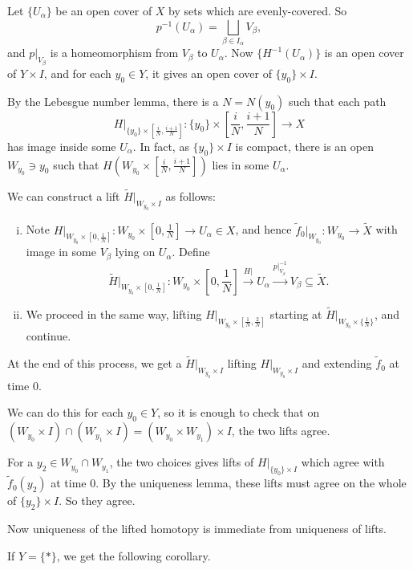 \documentclass[12pt]{article}
\begin{document}
\begin{proofbox}
	Let $\{U_\alpha\}$ be an open cover of $X$ by sets which are evenly-covered. So
	\[
	p^{-1}(U_\alpha) = \bigsqcup_{\beta \in I_\alpha} V_\beta,
	\]
	and $p|_{V_\beta}$ is a homeomorphism from $V_\beta$ to $U_\alpha$. Now $\{H^{-1}(U_\alpha)\}$ is an open cover of $Y \times I$, and for each $y_0 \in Y$, it gives an open cover of $\{y_0\} \times I$.

	By the Lebesgue number lemma, there is a $N = N(y_0)$ such that each path
	\[
		H|_{\{y_0\} \times [\frac{i}{N}, \frac{i+1}{N}]} : \{y_0\} \times \left[ \frac{i}{N}, \frac{i+1}{N}\right] \to X
	\]
	has image inside some $U_\alpha$. In fact, as $\{y_0\} \times I$ is compact, there is an open $W_{y_0} \ni y_0$ such that $H(W_{y_0} \times [\frac{i}{N}, \frac{i+1}{N}])$ lies in some $U_\alpha$.

	We can construct a lift $\tilde H|_{W_{y_0} \times I}$ as follows:
	\begin{enumerate}[(i)]
		\item Note $H|_{W_{y_0} \times [0, \frac{1}{N}]} : W_{y_0} \times [0, \frac{1}{N}] \to U_\alpha \in X$, and hence $\tilde f_0 |_{W_{y_0}} : W_{y_0} \to \tilde X$ with image in some $V_\beta$ lying on $U_\alpha$. Define
			\[
				\tilde H|_{W_{y_0} \times [0, \frac{1}{N}]} : W_{y_0} \times \left[0, \frac{1}{N} \right] \overset{H|}{\to} U_\alpha \overset{p|_{V_\beta}^{-1}}{\to} V_\beta \subseteq \tilde X.
			\]
		\item We proceed in the same way, lifting $H|_{W_{y_0} \times [\frac{1}{N}, \frac{2}{N}]}$ starting at $\tilde H|_{W_{y_0} \times \{\frac{1}{N}\}}$, and continue.
	\end{enumerate}
	At the end of this process, we get a $\tilde H|_{W_{y_0} \times I}$ lifting $H|_{W_{y_0} \times I}$ and extending $\tilde f_0$ at time $0$.

	We can do this for each $y_0 \in Y$, so it is enough to check that on $(W_{y_0} \times I) \cap (W_{y_1} \times I) = (W_{y_0} \times W_{y_1}) \times I$, the two lifts agree.

	For a $y_2 \in W_{y_0} \cap W_{y_1}$, the two choices gives lifts of $H|_{\{y_0\} \times I}$ which agree with $\tilde f_0(y_2)$ at time $0$. By the uniqueness lemma, these lifts must agree on the whole of $\{y_2\} \times I$. So they agree.

	Now uniqueness of the lifted homotopy is immediate from uniqueness of lifts.
\end{proofbox}

If $Y = \{\ast\}$, we get the following corollary.
\end{document}

